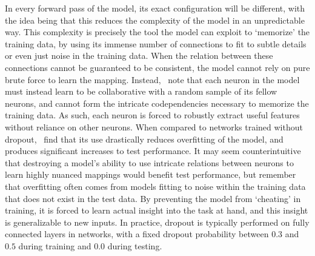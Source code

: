 In every forward pass of the model, its exact configuration will be different, with the idea being that this reduces the
complexity of the model in an unpredictable way. This complexity is precisely the tool the model can exploit to
`memorize' the training data, by using its immense number of connections to fit to subtle details or even just noise
in the training data. When the relation between these connections cannot be guaranteed to be consistent, the model
cannot rely on pure brute force to learn the mapping. Instead,~\citeauthor{srivastava2014} note that each neuron in the model must
instead learn to be collaborative with a random sample of its fellow neurons, and cannot form the intricate
codependencies necessary to memorize the training data. As such, each neuron is forced
to robustly extract useful features without reliance on other neurons. When compared to networks trained without
dropout,~\citeauthor{srivastava2014} find that its use drastically reduces overfitting of the model, and produces significant
increases to test performance. It may seem counterintuitive that destroying a model's ability to use intricate relations
between neurons to learn highly nuanced mappings would benefit test performance, but remember that overfitting often
comes from models fitting to noise within the training data that does not exist in the test data. By preventing the
model from `cheating' in training, it is forced to learn actual insight into the task at hand, and this insight is
generalizable to new inputs. In practice, dropout is typically performed on fully connected layers in networks, with
a fixed dropout probability between $0.3$ and $0.5$ during training and $0.0$ during testing.

